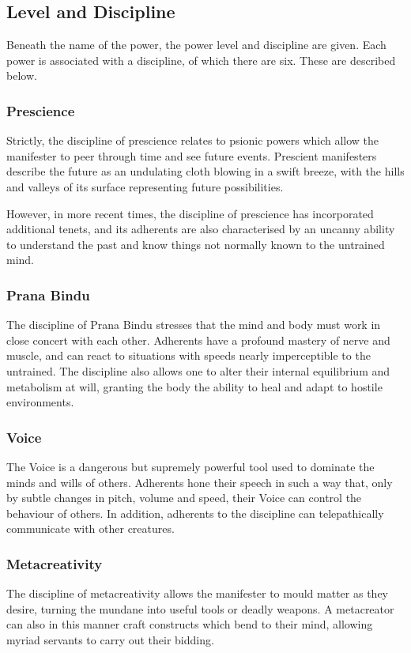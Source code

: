 \subsection{Level and Discipline}
Beneath the name of the power,
the power level and discipline are given.
Each power is associated with a discipline,
of which there are six.
These are described below.

\subsubsection{Prescience}
Strictly, the discipline of prescience relates to psionic powers
which allow the manifester to peer through time and see future events.
Prescient manifesters describe the future as
an undulating cloth blowing in a swift breeze,
with the hills and valleys of its surface representing
future possibilities. 

However, in more recent times,
the discipline of prescience has incorporated additional tenets,
and its adherents are also characterised by an uncanny ability to
understand the past and know things not normally known to
the untrained mind.

\subsubsection{Prana Bindu}
The discipline of Prana Bindu stresses that the mind and body
must work in close concert with each other.
Adherents have a profound mastery of nerve and muscle,
and can react to situations with speeds nearly imperceptible
to the untrained.
The discipline also allows one to alter their internal equilibrium
and metabolism at will,
granting the body the ability to heal and adapt to hostile environments.

\subsubsection{Voice}
The Voice is a dangerous but supremely powerful tool
used to dominate the minds and wills of others.
Adherents hone their speech in such a way that,
only by subtle changes in pitch, volume and speed,
their Voice can control the behaviour of others.
In addition, adherents to the discipline can telepathically
communicate with other creatures.

\subsubsection{Metacreativity}
The discipline of metacreativity allows the manifester to mould
matter as they desire,
turning the mundane into useful tools or deadly weapons.
A metacreator can also in this manner craft constructs
which bend to their mind,
allowing myriad servants to carry out their bidding.

